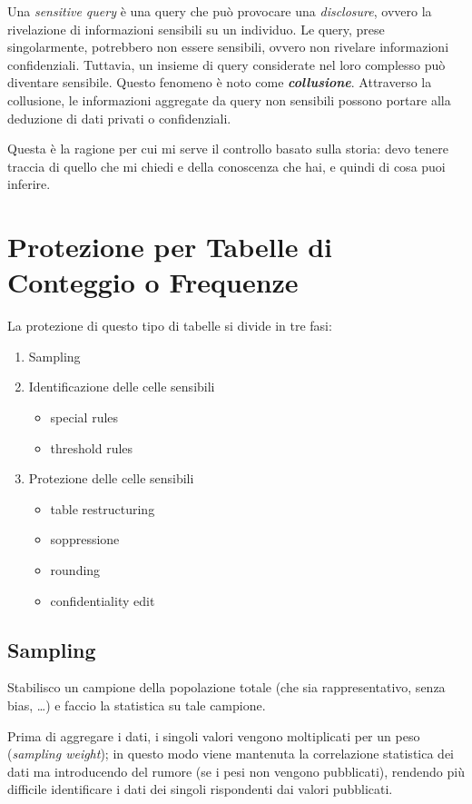 \documentclass{report}
\begin{document}
Una \textit{sensitive query} è una query che può provocare una \textit{disclosure}, ovvero la rivelazione di informazioni sensibili su un individuo.
Le query, prese singolarmente, potrebbero non essere sensibili, ovvero non rivelare informazioni confidenziali. 
Tuttavia, un insieme di query considerate nel loro complesso può diventare sensibile. Questo fenomeno è noto come \textit{\textbf{collusione}}. 
Attraverso la collusione, le informazioni aggregate da query non sensibili possono portare alla deduzione di dati privati o confidenziali.

Questa è la ragione per cui mi serve il controllo basato sulla 
storia: devo tenere traccia di quello che mi chiedi e della 
conoscenza che hai, e quindi di cosa puoi inferire.

\chapter{Protezione per Tabelle di Conteggio o Frequenze}

La protezione di questo tipo di tabelle si divide in tre fasi:
\begin{enumerate}
    \item Sampling
    \item Identificazione delle celle sensibili
    \begin{itemize}
        \item special rules 
        \item threshold rules 
    \end{itemize}
    \item Protezione delle celle sensibili
    \begin{itemize}
        \item table restructuring
        \item soppressione 
        \item rounding 
        \item confidentiality edit
    \end{itemize}
\end{enumerate}

\section{Sampling}
Stabilisco un campione della popolazione totale (che sia rappresentativo, senza bias, \dots) 
e faccio la statistica su tale campione.

Prima di aggregare i dati, i singoli valori vengono moltiplicati per un peso (\textit{sampling weight});
in questo modo viene mantenuta la correlazione statistica dei dati ma introducendo del rumore (se i pesi non vengono pubblicati), rendendo 
più difficile identificare i dati dei singoli rispondenti dai valori pubblicati.
\end{document}
